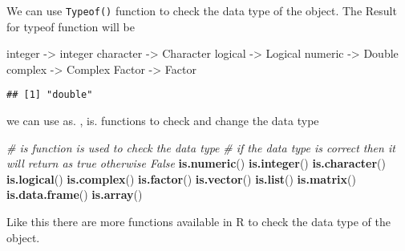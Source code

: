 \documentclass[
]{article}
\newenvironment{Shaded}{\begin{snugshade}}{\end{snugshade}}
\newcommand{\CommentTok}[1]{\textcolor[rgb]{0.56,0.35,0.01}{\textit{#1}}}
\newcommand{\DecValTok}[1]{\textcolor[rgb]{0.00,0.00,0.81}{#1}}
\newcommand{\FunctionTok}[1]{\textcolor[rgb]{0.13,0.29,0.53}{\textbf{#1}}}
\newcommand{\NormalTok}[1]{#1}
\newcommand{\OtherTok}[1]{\textcolor[rgb]{0.56,0.35,0.01}{#1}}
\begin{document}
We can use \texttt{Typeof()} function to check the data type of the
object. The Result for typeof function will be

\begin{Shaded}
\begin{Highlighting}[]
\NormalTok{integer }\OtherTok{{-}\textgreater{}}\NormalTok{ integer}
\NormalTok{character }\OtherTok{{-}\textgreater{}}\NormalTok{ Character}
\NormalTok{logical }\OtherTok{{-}\textgreater{}}\NormalTok{ Logical}
\NormalTok{numeric }\OtherTok{{-}\textgreater{}}\NormalTok{ Double}
\NormalTok{complex }\OtherTok{{-}\textgreater{}}\NormalTok{ Complex}
\NormalTok{Factor }\OtherTok{{-}\textgreater{}}\NormalTok{ Factor}
\end{Highlighting}
\end{Shaded}

\begin{Shaded}
\end{Shaded}

\begin{verbatim}
## [1] "double"
\end{verbatim}

\newpage

we can use as. , is. functions to check and change the data type

\begin{Shaded}
\begin{Highlighting}[]
\CommentTok{\# is function is used to check the data type}
\CommentTok{\# if the data type is correct then it will return as true otherwise False}
\FunctionTok{is.numeric}\NormalTok{()}
\FunctionTok{is.integer}\NormalTok{()}
\FunctionTok{is.character}\NormalTok{()}
\FunctionTok{is.logical}\NormalTok{()}
\FunctionTok{is.complex}\NormalTok{()}
\FunctionTok{is.factor}\NormalTok{()}
\FunctionTok{is.vector}\NormalTok{()}
\FunctionTok{is.list}\NormalTok{()}
\FunctionTok{is.matrix}\NormalTok{()}
\FunctionTok{is.data.frame}\NormalTok{()}
\FunctionTok{is.array}\NormalTok{()}
\end{Highlighting}
\end{Shaded}

Like this there are more functions available in R to check the data type
of the object.
\end{document}

